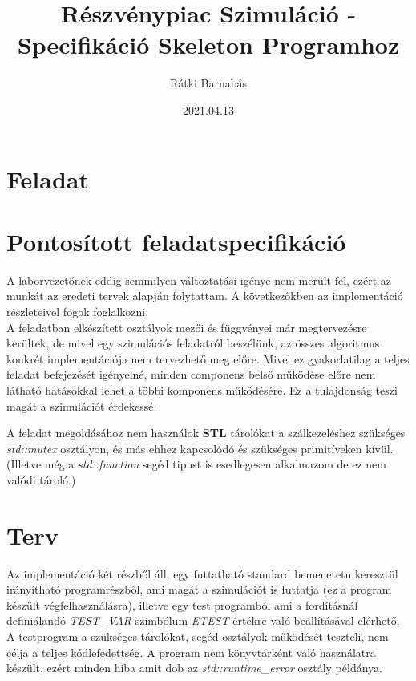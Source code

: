 \documentclass{article}[12pt,a4paper]
\title{Részvénypiac Szimuláció - Specifikáció Skeleton Programhoz}
\author{Rátki Barnabás}
\date{2021.04.13}
\begin{document}
    \maketitle

    \tableofcontents

    \section{Feladat}\label{sec:feladat}
    

    \section{Pontosított feladatspecifikáció}\label{sec:pontositott-feladatspecifikacio}
    A laborvezetőnek eddig semmilyen változtatási igénye nem merült fel, ezért az munkát az eredeti tervek alapján folytattam.
    A következőkben az implementáció részleteivel fogok foglalkozni.\\

    A feladatban elkészített osztályok mezői és függvényei már megtervezésre kerültek, de mivel egy szimulációs feladatról beszélünk, az összes algoritmus konkrét implementációja nem tervezhető meg előre.
    Mivel ez gyakorlatilag a teljes feladat befejezését igényelné, minden componens belső működése előre nem látható hatásokkal lehet a többi komponens működésére.
    Ez a tulajdonság teszi magát a szimulációt érdekessé.

    A feladat megoldásához nem használok \textbf{STL} tárolókat a szálkezeléshez szükséges \textit{std::mutex} osztályon, és más ehhez kapcsolódó és szükséges primitíveken kívül.
    (Illetve még a \textit{std::function} segéd tipust is esedlegesen alkalmazom de ez nem valódi tároló.)

    \section{Terv}
    Az implementáció két részből áll, egy futtatható standard bemenetetn keresztül irányítható programrészből, ami magát a szimulációt is futtatja (ez a program készült végfelhasználásra), illetve egy test programból ami a fordításnál definiálandó \textit{TEST\_VAR} szimbólum \textit{ETEST}-értékre való beállításával elérhető.
    A testprogram a szükséges tárolókat, segéd osztályok működését teszteli, nem célja a teljes kódlefedettség.
    A program nem könyvtárként való használatra készült, ezért minden hiba amit dob az \textit{std::runtime\_error} osztály példánya.
    
\end{document}
